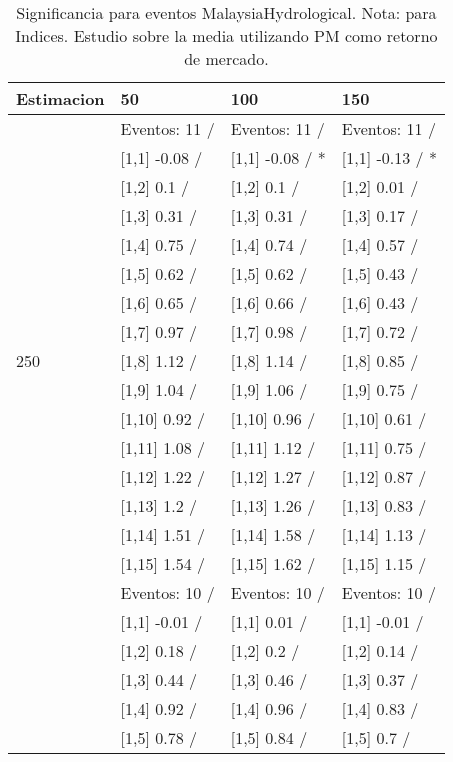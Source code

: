 \begin{table}

\caption{Significancia para eventos MalaysiaHydrological. Nota: para Indices. Estudio sobre la media utilizando PM como retorno de mercado.}
\centering
\begin{tabular}[t]{llll}
\toprule
Estimacion & 50 & 100 & 150\\
\midrule
 & Eventos:  11 / & Eventos:  11 / & Eventos:  11 /\\
 & {}[1,1] -0.08  / & {}[1,1] -0.08  / * & {}[1,1] -0.13  / *\\
 & {}[1,2] 0.1  / & {}[1,2] 0.1  / & {}[1,2] 0.01  /\\
 & {}[1,3] 0.31  / & {}[1,3] 0.31  / & {}[1,3] 0.17  /\\
 & {}[1,4] 0.75  / & {}[1,4] 0.74  / & {}[1,4] 0.57  /\\
\addlinespace
 & {}[1,5] 0.62  / & {}[1,5] 0.62  / & {}[1,5] 0.43  /\\
 & {}[1,6] 0.65  / & {}[1,6] 0.66  / & {}[1,6] 0.43  /\\
 & {}[1,7] 0.97  / & {}[1,7] 0.98  / & {}[1,7] 0.72  /\\
250 & {}[1,8] 1.12  / & {}[1,8] 1.14  / & {}[1,8] 0.85  /\\
 & {}[1,9] 1.04  / & {}[1,9] 1.06  / & {}[1,9] 0.75  /\\
\addlinespace
 & {}[1,10] 0.92  / & {}[1,10] 0.96  / & {}[1,10] 0.61  /\\
 & {}[1,11] 1.08  / & {}[1,11] 1.12  / & {}[1,11] 0.75  /\\
 & {}[1,12] 1.22  / & {}[1,12] 1.27  / & {}[1,12] 0.87  /\\
 & {}[1,13] 1.2  / & {}[1,13] 1.26  / & {}[1,13] 0.83  /\\
 & {}[1,14] 1.51  / & {}[1,14] 1.58  / & {}[1,14] 1.13  /\\
\addlinespace
 & {}[1,15] 1.54  / & {}[1,15] 1.62  / & {}[1,15] 1.15  /\\
 & Eventos:  10 / & Eventos:  10 / & Eventos:  10 /\\
 & {}[1,1] -0.01  / & {}[1,1] 0.01  / & {}[1,1] -0.01  /\\
 & {}[1,2] 0.18  / & {}[1,2] 0.2  / & {}[1,2] 0.14  /\\
 & {}[1,3] 0.44  / & {}[1,3] 0.46  / & {}[1,3] 0.37  /\\
\addlinespace
 & {}[1,4] 0.92  / & {}[1,4] 0.96  / & {}[1,4] 0.83  /\\
 & {}[1,5] 0.78  / & {}[1,5] 0.84  / & {}[1,5] 0.7  /\\

\end{tabular}
\end{table}
